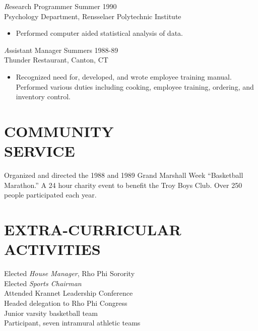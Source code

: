 \documentclass[line,margin]{res}
\begin{document}
\begin{resume}
                {\textit Research Programmer} \hfill            Summer 1990 \\
                Psychology Department, Rensselaer Polytechnic 
                Institute 
                 \begin{itemize}  \itemsep -2pt %
                 \item Performed computer aided statistical analysis 
                    of data. 
                 \end{itemize} 
                {\textit Assistant Manager} \hfill        Summers 1988-89 \\
                Thunder Restaurant, Canton, CT
                  \begin{itemize}
                   \item Recognized need for, developed, and wrote 
                    employee training manual. Performed various 
                    duties including cooking, employee training, 
                    ordering, and inventory control. 
                   \end{itemize} 
 
\section{COMMUNITY \\ SERVICE}  Organized and directed the 1988 and 1989 Grand 
                 Marshall Week \newline ``Basketball Marathon.'' A 24 hour 
                charity event to benefit the Troy Boys Club. Over 
                250 people participated each year. 

\section{EXTRA-CURRICULAR \\ ACTIVITIES}             
            Elected {\it House Manager}, Rho Phi Sorority \\
            Elected {\it Sports Chairman} \\
            Attended Krannet Leadership Conference \\
                Headed delegation to Rho Phi Congress \\
                Junior varsity basketball team \\
                Participant, seven intramural athletic teams 
 

\end{resume}
\end{document}
